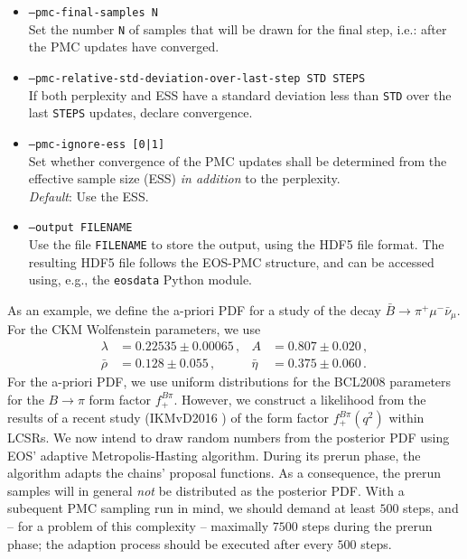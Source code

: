 \begin{itemize}
    \item[] \texttt{--pmc-final-samples N}\\[\medskipamount]
        Set the number \texttt{N} of samples that will be drawn for the final step,
        i.e.: after the PMC updates have converged.

    \item[] \texttt{--pmc-relative-std-deviation-over-last-step STD STEPS}\\[\medskipamount]
        If both perplexity and ESS have a standard deviation less than \texttt{STD} over the
        last \texttt{STEPS} updates, declare convergence.

    \item[] \texttt{--pmc-ignore-ess [0|1]}\\[\medskipamount]
        Set whether convergence of the PMC updates shall be determined from the
        effective sample size (ESS) \emph{in addition} to the perplexity.\\
        \emph{Default}: Use the ESS.

    \item[] \texttt{--output FILENAME}\\[\medskipamount]
        Use the file \texttt{FILENAME} to store the output, using the HDF5 file format.
        The resulting HDF5 file follows the EOS-PMC structure, and can be accessed using, e.g.,
        the \texttt{eosdata} Python module.
\end{itemize}

As an example, we define the a-priori \gls{PDF} for a study of the decay $\bar{B}\to \pi^+\mu^-\bar\nu_\mu$.
For the CKM Wolfenstein parameters, we use
\begin{equation*}
\begin{aligned}
    \lambda    & = 0.22535 \pm 0.00065\,,  &
    A          & = 0.807 \pm 0.020\,,      \\
    \bar{\rho} & = 0.128 \pm 0.055\,,      &
    \bar{\eta} & = 0.375 \pm 0.060\,.
\end{aligned}
\end{equation*}
For the a-priori \gls{PDF}, we use uniform distributions for the BCL2008
\cite{Bourrely:2008za} parameters for the $B\to \pi$ form factor $f^{B\pi}_+$.
However, we construct a likelihood from the results of a recent study
(IKMvD2016 \cite{Imsong:2014oqa}) of the form factor $f^{B\pi}_+(q^2)$ within \glspl{LCSR}.
We now intend to draw random numbers from the posterior PDF using EOS' adaptive
Metropolis-Hasting algorithm.  During its prerun phase, the algorithm adapts
the chains' proposal functions. As a consequence, the prerun samples will in
general \emph{not} be distributed as the posterior \gls{PDF}. With a subequent
PMC sampling run in mind, we should demand at least $500$ steps, and -- for a
problem of this complexity -- maximally $7500$ steps during the prerun phase;
the adaption process should be executed after every $500$ steps.\\

